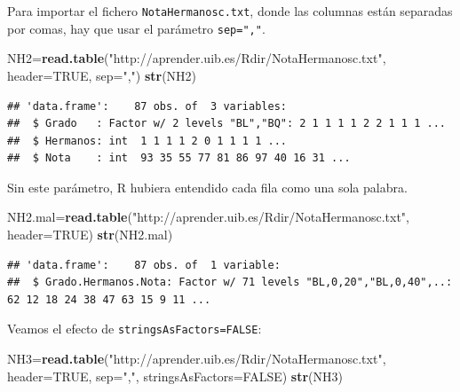 \documentclass[]{book}
\newenvironment{Shaded}{\begin{snugshade}}{\end{snugshade}}
\newcommand{\DataTypeTok}[1]{\textcolor[rgb]{0.13,0.29,0.53}{#1}}
\newcommand{\KeywordTok}[1]{\textcolor[rgb]{0.13,0.29,0.53}{\textbf{#1}}}
\newcommand{\NormalTok}[1]{#1}
\newcommand{\OtherTok}[1]{\textcolor[rgb]{0.56,0.35,0.01}{#1}}
\newcommand{\StringTok}[1]{\textcolor[rgb]{0.31,0.60,0.02}{#1}}
\theoremstyle{definition}
\theoremstyle{definition}
\theoremstyle{definition}
\theoremstyle{remark}
\begin{document}
Para importar el fichero \texttt{NotaHermanosc.txt}, donde las columnas están separadas por comas, hay que usar el parámetro \texttt{sep=","}.

\begin{Shaded}
\begin{Highlighting}[]
\NormalTok{NH2=}\KeywordTok{read.table}\NormalTok{(}\StringTok{"http://aprender.uib.es/Rdir/NotaHermanosc.txt"}\NormalTok{, }\DataTypeTok{header=}\OtherTok{TRUE}\NormalTok{, }\DataTypeTok{sep=}\StringTok{","}\NormalTok{)}
\KeywordTok{str}\NormalTok{(NH2)}
\end{Highlighting}
\end{Shaded}

\begin{verbatim}
## 'data.frame':    87 obs. of  3 variables:
##  $ Grado   : Factor w/ 2 levels "BL","BQ": 2 1 1 1 1 2 2 1 1 1 ...
##  $ Hermanos: int  1 1 1 1 2 0 1 1 1 1 ...
##  $ Nota    : int  93 35 55 77 81 86 97 40 16 31 ...
\end{verbatim}

Sin este parámetro, R hubiera entendido cada fila como una sola palabra.

\begin{Shaded}
\begin{Highlighting}[]
\NormalTok{NH2.mal=}\KeywordTok{read.table}\NormalTok{(}\StringTok{"http://aprender.uib.es/Rdir/NotaHermanosc.txt"}\NormalTok{, }\DataTypeTok{header=}\OtherTok{TRUE}\NormalTok{)}
\KeywordTok{str}\NormalTok{(NH2.mal)}
\end{Highlighting}
\end{Shaded}

\begin{verbatim}
## 'data.frame':    87 obs. of  1 variable:
##  $ Grado.Hermanos.Nota: Factor w/ 71 levels "BL,0,20","BL,0,40",..: 62 12 18 24 38 47 63 15 9 11 ...
\end{verbatim}

Veamos el efecto de \texttt{stringsAsFactors=FALSE}:

\begin{Shaded}
\begin{Highlighting}[]
\NormalTok{NH3=}\KeywordTok{read.table}\NormalTok{(}\StringTok{"http://aprender.uib.es/Rdir/NotaHermanosc.txt"}\NormalTok{, }\DataTypeTok{header=}\OtherTok{TRUE}\NormalTok{, }
               \DataTypeTok{sep=}\StringTok{","}\NormalTok{, }\DataTypeTok{stringsAsFactors=}\OtherTok{FALSE}\NormalTok{)}
\KeywordTok{str}\NormalTok{(NH3)}
\end{Highlighting}
\end{Shaded}
\end{document}
